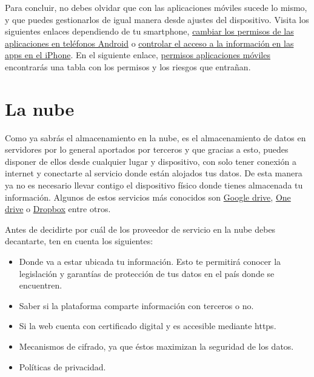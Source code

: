 \documentclass[
  spanish,
  a4paper,
  openany]{book}
\begin{document}
Para concluir, no debes olvidar que con las aplicaciones móviles sucede lo mismo, y que puedes gestionarlos de igual manera desde ajustes del dispositivo. Visita los siguientes enlaces dependiendo de tu smartphone, \href{https://support.google.com/android/answer/9431959?hl=es}{cambiar los permisos de las aplicaciones en teléfonos Android} o \href{https://support.apple.com/es-es/guide/iphone/iph251e92810/ios}{controlar el acceso a la información en las apps en el iPhone}. En el siguiente enlace, \href{https://www.osi.es/sites/default/files/docs/c5-eg-permisos-apps-riesgos.pdf}{permisos aplicaciones móviles} encontrarás una tabla con los permisos y los riesgos que entrañan.

\hypertarget{la-nube}{%
\section{La nube}\label{la-nube}}

Como ya sabrás el almacenamiento en la nube, es el almacenamiento de datos en servidores por lo general aportados por terceros y que gracias a esto, puedes disponer de ellos desde cualquier lugar y dispositivo, con solo tener conexión a internet y conectarte al servicio donde están alojados tus datos. De esta manera ya no es necesario llevar contigo el dispositivo físico donde tienes almacenada tu información. Algunos de estos servicios más conocidos son \href{https://www.google.com/intl/en_in/drive/}{Google drive}, \href{https://www.microsoft.com/en-us/microsoft-365/onedrive/online-cloud-storage}{One drive} o \href{https://www.dropbox.com/}{Dropbox} entre otros.

Antes de decidirte por cuál de los proveedor de servicio en la nube debes decantarte, ten en cuenta los siguientes:

\begin{itemize}
\item
  Donde va a estar ubicada tu información. Esto te permitirá conocer la legislación y
  garantías de protección de tus datos en el país donde se encuentren.
\item
  Saber si la plataforma comparte información con terceros o no.
\item
  Si la web cuenta con certificado digital y es accesible mediante https.
\item
  Mecanismos de cifrado, ya que éstos maximizan la seguridad de los datos.
\item
  Políticas de privacidad.
\end{itemize}
\end{document}
